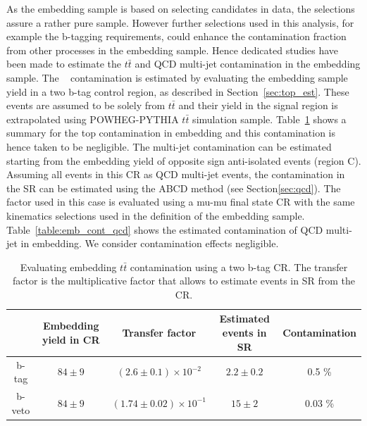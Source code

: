 
As the embedding sample is based on selecting \Zmumu candidates in data, the selections assure a rather 
pure \Zmumu sample. However further selections used in this analysis, for example the b-tagging requirements, 
could enhance the contamination fraction from other processes in the embedding sample. Hence dedicated studies have been
made to estimate the $t\bar{t}$ and QCD multi-jet contamination in the embedding sample.
The \ttbar~ contamination is estimated by evaluating the embedding sample yield in a two b-tag control region,
as described in Section~\ref{sec:top_est}. These events are assumed to be solely from $t\bar{t}$
and their yield in the signal region is extrapolated using POWHEG-PYTHIA $t\bar{t}$ simulation sample.
Table~\ref{table:emb_cont_tt} shows a summary for the top contamination in embedding and this contamination is hence taken to be negligible. The multi-jet contamination can be estimated starting 
from the embedding yield of opposite sign anti-isolated events (region C).
Assuming all events in this CR as QCD multi-jet events, the contamination in the SR 
can be estimated using the ABCD method (see Section\ref{sec:qcd}). The \rqcd factor 
used in this case is evaluated using a mu-mu final state CR with the same kinematics selections
used in the definition of the embedding sample. Table~\ref{table:emb_cont_qcd}
shows the estimated contamination of QCD multi-jet in embedding. 
We  consider contamination effects negligible.

\begin{table} [p]
\centering
\begin{tabular}{c c c c c}
\hline
\hline
 & Embedding yield in CR & Transfer factor & Estimated events in SR & Contamination \\ [0.5ex]
\hline
b-tag & $84 \pm 9$  & $(2.6 \pm 0.1) \times 10^{-2}$ &  $2.2 \pm 0.2$&  0.5 \% \\
b-veto & $84 \pm 9$ & $(1.74 \pm 0.02) \times 10^{-1}$ & $15 \pm 2$ & 0.03 \% \\[1ex]
\hline
\end{tabular}
\caption{Evaluating embedding $t\bar{t}$ contamination using a two b-tag CR. The transfer factor is the
multiplicative factor that allows to estimate events in SR from the CR. }
\label{table:emb_cont_tt}
\end{table}

